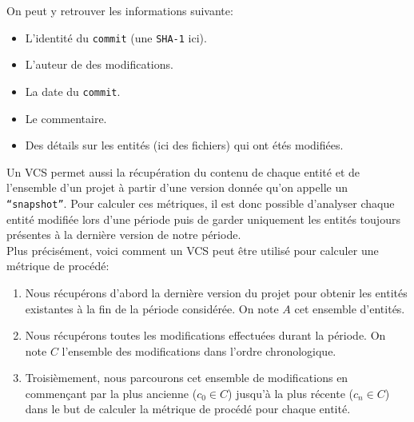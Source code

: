 On peut y retrouver les informations suivante: 
\begin{itemize}
\item L'identité du \texttt{commit} (une \texttt{SHA-1} ici).
\item L'auteur de des modifications.
\item La date du \texttt{commit}.
\item Le commentaire.
\item Des détails sur les entités (ici des fichiers) qui ont étés modifiées.\\
\end{itemize}

Un VCS permet aussi la récupération du contenu de chaque entité et de l'ensemble d'un projet à partir d'une version donnée qu'on appelle un \texttt{``snapshot''}. Pour calculer ces métriques, il est donc possible d'analyser chaque entité modifiée lors d'une période puis de garder uniquement les entités toujours présentes à la dernière version de notre période.\\

Plus précisément, voici comment un VCS peut être utilisé pour calculer une métrique de procédé: 
\begin{enumerate}
\item Nous récupérons d'abord la dernière version du projet pour obtenir les entités existantes à la fin de la période considérée. On note $A$ cet ensemble d'entités.
\item Nous récupérons toutes les modifications effectuées durant la période. On note $C$ l'ensemble des modifications dans l'ordre chronologique.
\item Troisièmement, nous parcourons cet ensemble de modifications en commençant par la plus ancienne ($c_0 \in C$) jusqu'à la plus récente ($c_n \in C$) dans le but de calculer la métrique de procédé pour chaque entité.
\end{enumerate}

